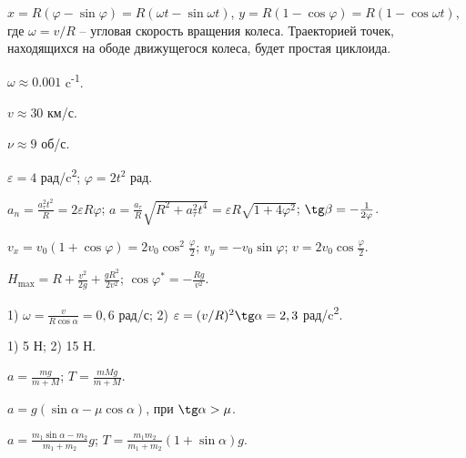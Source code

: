 \begin{Answer}{35}
$x= R(\varphi - \sin \varphi) = R(\omega t - \sin \omega t)$, $y=R(1-\cos \varphi) = R(1-\cos \omega t)$, где $\omega = v/R$ -- угловая скорость вращения колеса. Траекторией точек, находящихся на ободе движущегося колеса, будет простая циклоида.
\end{Answer}
\begin{Answer}{36}
$\omega \approx 0.001$ c\textsuperscript{-1}.
\end{Answer}
\begin{Answer}{37}
$v \approx 30$ км/с.
\end{Answer}
\begin{Answer}{38}
$\nu \approx 9$ об/с.
\end{Answer}
\begin{Answer}{39}
$\varepsilon = 4$ рад/c\textsuperscript{2}; $\varphi = 2t^2$ рад.
\end{Answer}
\begin{Answer}{40}
$a_n = \frac{a_{\tau}^2 t^2}{R} = 2 \varepsilon R \varphi$; $a = \frac{a_{\tau}}{R} \sqrt{R^2 + a_{\tau}^2 t^4} = \varepsilon R \sqrt{1 + 4 \varphi^2}$; $\tg \beta = -\frac{1}{2\varphi}$.
\end{Answer}
\begin{Answer}{41}
$v_x = v_0 (1 + \cos \varphi) = 2v_0 \cos^2 \frac{\varphi}{2}$; $v_y = -v_0 \sin \varphi$; $v = 2v_0 \cos \frac{\varphi}{2}$.
\end{Answer}
\begin{Answer}{42}
$H_{\max} = R + \frac{v^2}{2g} + \frac{gR^2}{2v^2}$; $\cos \varphi^{*} = - \frac{Rg}{v^2}$.
\end{Answer}
\begin{Answer}{43}
1) $\omega = \frac{v}{R \cos \alpha} = 0,6$ рад/с; 2) $\varepsilon = (v/R)^2 \tg \alpha = 2,3$ рад/c\textsuperscript{2}.
\end{Answer}
\begin{Answer}{44}
1) 5 Н; 2) 15 Н.
\end{Answer}
\begin{Answer}{45}
$a = \frac{mg}{m+M}$; $T = \frac{mMg}{m+M}$.
\end{Answer}
\begin{Answer}{46}
$a = g (\sin \alpha - \mu \cos \alpha)$, при $\tg \alpha > \mu$.
\end{Answer}
\begin{Answer}{47}
$a = \frac{m_1 \sin \alpha - m_2}{m_1 + m_2}g$; $T = \frac{m_1 m_2}{m_1 + m_2}\left( 1+ \sin \alpha \right)g$.
\end{Answer}
